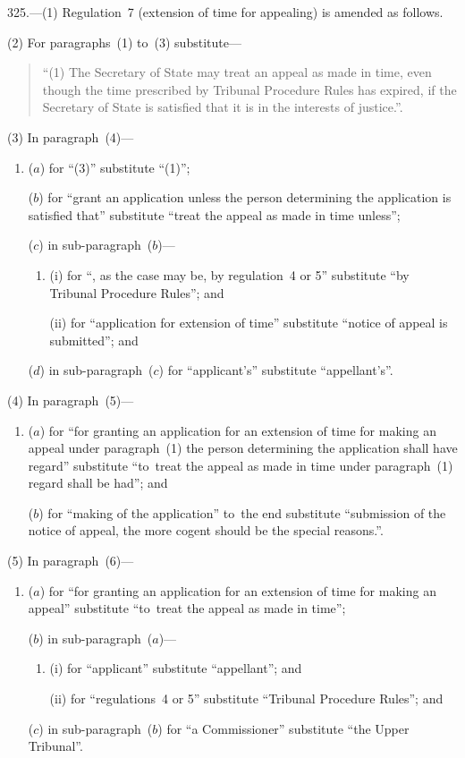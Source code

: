 \documentclass[12pt,a4paper]{article}
\begin{document}
\medskip

325.---(1)  Regulation~7 (extension of time for appealing) is amended as follows.

(2) For paragraphs~(1) to~(3) substitute—
\begin{quotation}
“(1) The Secretary of State may treat an appeal as made in time, even though the time prescribed by Tribunal Procedure Rules has expired, if the Secretary of State is satisfied that it is in the interests of justice.”.
\end{quotation}

(3) In paragraph~(4)—
\begin{enumerate}\item[]
($a$) for “(3)” substitute “(1)”;

($b$) for “grant an application unless the person determining the application is satisfied that” substitute “treat the appeal as made in time unless”;

($c$) in sub-paragraph~($b$)—
\begin{enumerate}\item[]
(i) for “, as the case may be, by regulation~4 or 5” substitute “by Tribunal Procedure Rules”; and

(ii) for “application for extension of time” substitute “notice of appeal is submitted”; and
\end{enumerate}

($d$) in sub-paragraph~($c$)  for “applicant’s” substitute “appellant’s”.
\end{enumerate}

(4) In paragraph~(5)—
\begin{enumerate}\item[]
($a$) for “for granting an application for an extension of time for making an appeal under paragraph~(1) the person determining the application shall have regard” substitute “to~treat the appeal as made in time under paragraph~(1) regard shall be had”; and

($b$) for “making of the application” to~the end substitute “submission of the notice of appeal, the more cogent should be the special reasons.”.
\end{enumerate}

(5) In paragraph~(6)—
\begin{enumerate}\item[]
($a$) for “for granting an application for an extension of time for making an appeal” substitute “to~treat the appeal as made in time”;

($b$) in sub-paragraph~($a$)—
\begin{enumerate}\item[]
(i) for “applicant” substitute “appellant”; and

(ii) for “regulations~4 or 5” substitute “Tribunal Procedure Rules”; and
\end{enumerate}

($c$) in sub-paragraph~($b$)  for “a Commissioner” substitute “the Upper Tribunal”.
\end{enumerate}
\end{document}
